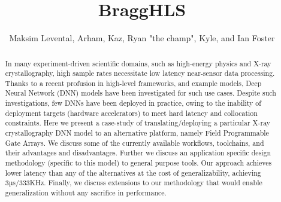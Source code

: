 \documentclass[sigconf,techreport]{acmart}
\newcommand{\ian}[1]{}
\newcommand{\commnt}[2]{#2}
\newcommand{\ian}[1]{{\textcolor{orange}{ Ian: #1 }}}
\newcommand{\commnt}[2]{{{\color{green} \{#1\}} {\color{blue} #2}}}
\begin{document}
\title{BraggHLS}


\author{Maksim Levental, Arham, Kaz, Ryan "the champ", Kyle, and Ian Foster}

\renewcommand{\shortauthors}{Levental et al.}


\begin{abstract}
	In many experiment-driven scientific domains, such as high-energy physics and X-ray crystallography, high sample rates necessitate low latency near-sensor data processing.
	Thanks to a recent profusion in high-level frameworks, and example models, Deep Neural Network (DNN) models have been investigated for such use cases.
	Despite such investigations, few DNNs have been deployed in practice, owing to the inability of deployment targets (hardware accelerators) to meet hard latency and collocation constraints.
	Here we present a case-study of translating/deploying a particular X-ray crystallography DNN model to an alternative platform, namely Field Programmable Gate Arrays.
	We discuss some of the currently available workflows, toolchains, and their advantages and disadvantages.
	Further we discuss an application specific design methodology (specific to this model) to general purpose tools.
	Our approach achieves lower latency than any of the alternatives at the cost of generalizability, achieving \commnt{TBD}{3µs/333KHz}.
	Finally, we discuss extensions to our methodology that would enable generalization without any sacrifice in performance.
\end{abstract}


\end{document}
